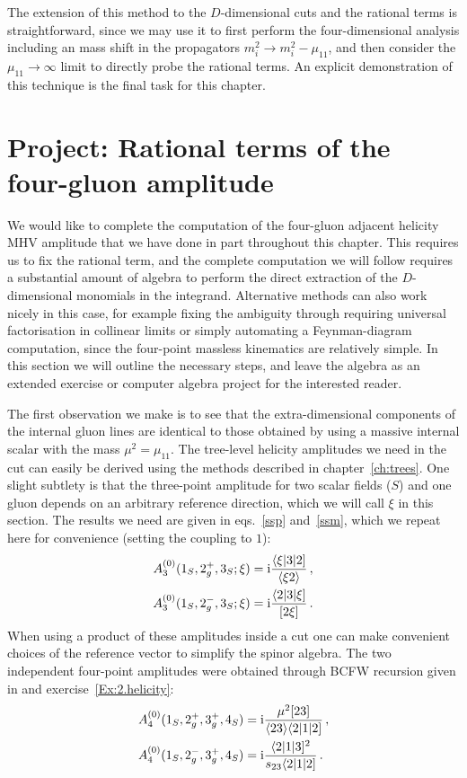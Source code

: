 The extension of this method to the $D$-dimensional cuts and the rational terms
is straightforward, since we may use it to first perform the four-dimensional
analysis including an mass shift in the propagators $m_i^2\to m_i^2-\mu_{11}$, and then consider the
$\mu_{11}\to \infty$ limit to directly probe the rational terms. An explicit demonstration of this technique is the final task for this chapter. 

\section{Project: Rational terms of the four-gluon amplitude \label{sec:rat4g}}


We would like to complete the computation of the four-gluon adjacent helicity MHV amplitude that we
have done in part throughout this chapter. This requires us to fix the rational
term, and the complete computation we will follow requires a substantial amount
of algebra to perform the direct extraction of the $D$-dimensional monomials in
the integrand. Alternative methods can also work nicely in this case, for
example fixing the ambiguity through requiring universal factorisation in
collinear limits or simply automating a Feynman-diagram computation, since the
four-point massless kinematics are relatively simple. In this section we will
outline the necessary steps, and leave the algebra as an extended exercise or
computer algebra project for the interested reader.

The first observation we make is to see that the extra-dimensional components
of the internal gluon lines are identical to those obtained by using a massive
internal scalar with the mass $\mu^2 = \mu_{11}$. The tree-level helicity
amplitudes we need in the cut can easily be derived using the methods described
in chapter~\ref{ch:trees}. One slight subtlety is that the three-point amplitude for two scalar fields ($S$) and one gluon depends on an arbitrary reference direction, which we will call $\xi$ in
this section. The results we need are given in eqs.~\eqref{ssp} and~\eqref{ssm}, which we repeat here for convenience (setting the coupling to $1$):
\begin{align}
  A^{(0)}_3(1_S, 2_g^+, 3_S; \xi) &= \mathrm{i} \frac{\langle \xi | 3 | 2 ]}{\langle \xi 2 \rangle} \,, \\
  A^{(0)}_3(1_S, 2_g^-, 3_S; \xi) &= \mathrm{i} \frac{\langle 2 | 3 | \xi ]}{[ 2 \xi ]} \,.
\end{align}
When using a product of these amplitudes inside a cut one can make convenient
choices of the reference vector to simplify the spinor algebra. The two
independent four-point amplitudes were obtained through BCFW recursion given in   and exercise~\ref{Ex:2.helicity}:
\begin{align}
  A^{(0)}_4(1_S, 2_g^+, 3_g^+, 4_S) &= \mathrm{i} \frac{\mu^2 [ 2 3 ]}{\langle 2 3 \rangle \langle 2 | 1 | 2 ]} \,, \\
  A^{(0)}_4(1_S, 2_g^-, 3_g^+, 4_S) &= \mathrm{i} \frac{\langle 2 | 1 | 3 ]^2}{s_{23} \langle 2 | 1 | 2 ]} \,.
\end{align}

